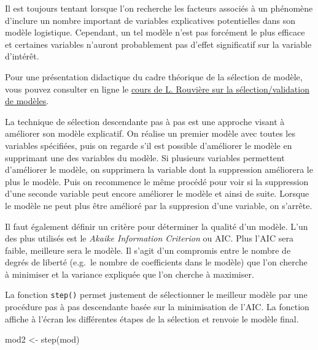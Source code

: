 \documentclass[
  letterpaper,
  DIV=11,
  numbers=noendperiod,
  oneside]{scrreprt}
\newenvironment{Shaded}{\begin{snugshade}}{\end{snugshade}}
\newcommand{\FunctionTok}[1]{\textcolor[rgb]{0.28,0.35,0.67}{#1}}
\newcommand{\NormalTok}[1]{\textcolor[rgb]{0.00,0.23,0.31}{#1}}
\newcommand{\OtherTok}[1]{\textcolor[rgb]{0.00,0.23,0.31}{#1}}
\begin{document}
Il est toujours tentant lorsque l'on recherche les facteurs associés à
un phénomène d'inclure un nombre important de variables explicatives
potentielles dans son modèle logistique. Cependant, un tel modèle n'est
pas forcément le plus efficace et certaines variables n'auront
probablement pas d'effet significatif sur la variable d'intérêt.

Pour une présentation didactique du cadre théorique de la sélection de
modèle, vous pouvez consulter en ligne le
\href{https://perso.univ-rennes2.fr/system/files/users/rouviere_l/chapitre3_glm.pdf}{cours
de L. Rouvière sur la sélection/validation de modèles}.

La technique de sélection descendante pas à pas est une approche visant
à améliorer son modèle explicatif. On réalise un premier modèle avec toutes les
variables spécifiées, puis on regarde s'il est possible d'améliorer le
modèle en supprimant une des variables du modèle. Si plusieurs variables
permettent d'améliorer le modèle, on supprimera la variable dont la
suppression améliorera le plus le modèle. Puis on recommence le même
procédé pour voir si la suppression d'une seconde variable peut encore
améliorer le modèle et ainsi de suite. Lorsque le modèle ne peut plus
être amélioré par la suppresion d'une variable, on s'arrête.

Il faut également définir un critère pour déterminer la qualité d'un
modèle. L'un des plus utilisés est le \emph{Akaike Information
Criterion} ou AIC. Plus l'AIC sera faible, meilleure sera le modèle. Il
s'agit d'un compromis entre le nombre de degrés de liberté (e.g.~le
nombre de coefficients dans le modèle) que l'on cherche à minimiser et
la variance expliquée que l'on cherche à maximiser.

La fonction \texttt{step()} permet justement de sélectionner le meilleur
modèle par une procédure pas à pas descendante basée sur la minimisation
de l'AIC. La fonction affiche à l'écran les différentes étapes de la
sélection et renvoie le modèle final.

\begin{Shaded}
\begin{Highlighting}[]
\NormalTok{mod2 }\OtherTok{\textless{}{-}} \FunctionTok{step}\NormalTok{(mod)}
\end{Highlighting}
\end{Shaded}
\end{document}
